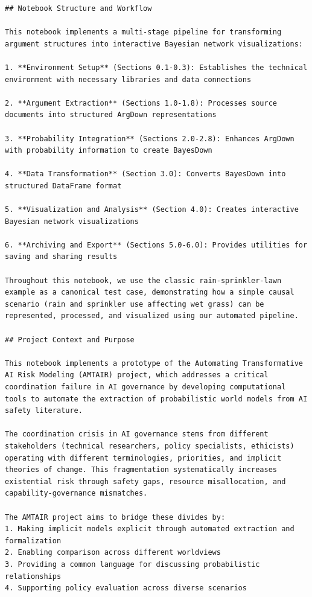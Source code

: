 \documentclass[
  11pt,
  letterpaper,
]{book}
\begin{document}
\begin{verbatim}
## Notebook Structure and Workflow

This notebook implements a multi-stage pipeline for transforming argument structures into interactive Bayesian network visualizations:

1. **Environment Setup** (Sections 0.1-0.3): Establishes the technical environment with necessary libraries and data connections

2. **Argument Extraction** (Sections 1.0-1.8): Processes source documents into structured ArgDown representations

3. **Probability Integration** (Sections 2.0-2.8): Enhances ArgDown with probability information to create BayesDown

4. **Data Transformation** (Section 3.0): Converts BayesDown into structured DataFrame format

5. **Visualization and Analysis** (Section 4.0): Creates interactive Bayesian network visualizations

6. **Archiving and Export** (Sections 5.0-6.0): Provides utilities for saving and sharing results

Throughout this notebook, we use the classic rain-sprinkler-lawn example as a canonical test case, demonstrating how a simple causal scenario (rain and sprinkler use affecting wet grass) can be represented, processed, and visualized using our automated pipeline.

## Project Context and Purpose

This notebook implements a prototype of the Automating Transformative AI Risk Modeling (AMTAIR) project, which addresses a critical coordination failure in AI governance by developing computational tools to automate the extraction of probabilistic world models from AI safety literature.

The coordination crisis in AI governance stems from different stakeholders (technical researchers, policy specialists, ethicists) operating with different terminologies, priorities, and implicit theories of change. This fragmentation systematically increases existential risk through safety gaps, resource misallocation, and capability-governance mismatches.

The AMTAIR project aims to bridge these divides by:
1. Making implicit models explicit through automated extraction and formalization
2. Enabling comparison across different worldviews
3. Providing a common language for discussing probabilistic relationships
4. Supporting policy evaluation across diverse scenarios


\end{verbatim}
\end{document}
